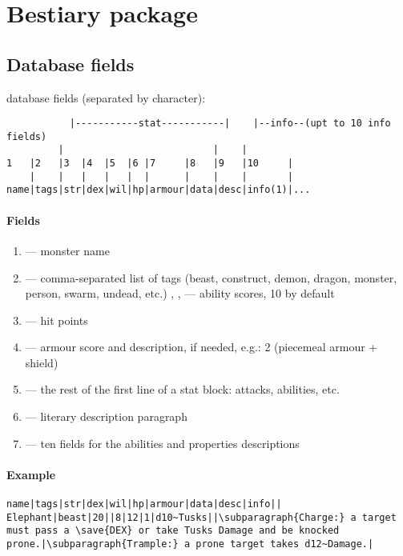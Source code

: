 \documentclass[itdr]{subfiles}
\begin{document}
\label{ch:appendix_b}

\noindent\begin{minipage}{\textwidth}
\section{Bestiary package}

\subsection{Database fields}

 database fields (separated by \fbox{\lstinline!|!} character):

\noindent\begin{lstlisting}
	       |-----------stat-----------|    |--info--(upt to 10 info fields)
         |                          |    |
1   |2   |3  |4  |5  |6 |7     |8   |9   |10     |
    |    |   |   |   |  |      |    |    |       |
name|tags|str|dex|wil|hp|armour|data|desc|info(1)|...
\end{lstlisting}

\paragraph{Fields}
\begin{enumerate}
	\item {} --- monster name
	\item {} --- comma-separated list of tags (beast, construct, demon, dragon, monster, person, swarm, undead, etc.)
	 , ,  --- ability scores, 10 by default
	\item {} --- hit points
	\item {} --- armour score and description, if needed, e.g.: 2 (piecemeal armour + shield)
	\item {} --- the rest of the first line of a stat block: attacks, abilities, etc.
	\item {} --- literary description paragraph
	\item {} --- ten fields for the abilities and properties descriptions
\end{enumerate}

\paragraph{Example}
\noindent\begin{lstlisting}
name|tags|str|dex|wil|hp|armour|data|desc|info||
Elephant|beast|20||8|12|1|d10~Tusks||\subparagraph{Charge:} a target must pass a \save{DEX} or take Tusks Damage and be knocked prone.|\subparagraph{Trample:} a prone target takes d12~Damage.|
\end{lstlisting}
\end{minipage}
\end{document}
